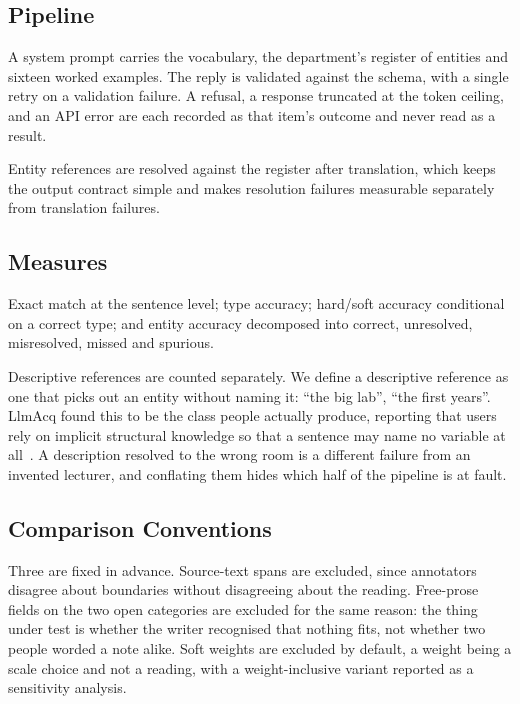 \documentclass[sigconf,screen,review,anonymous]{acmart}
\begin{document}
\subsection{Pipeline}

A system prompt carries the vocabulary, the department's register of entities
and sixteen worked examples. The reply is validated against the schema, with a
single retry on a validation failure. A refusal, a response truncated at the
token ceiling, and an API error are each recorded as that item's outcome and
never read as a result.

Entity references are resolved against the register after translation, which
keeps the output contract simple and makes resolution failures measurable
separately from translation failures.

\subsection{Measures}

Exact match at the sentence level; type accuracy; hard/soft accuracy
conditional on a correct type; and entity accuracy decomposed into correct,
unresolved, misresolved, missed and spurious.

Descriptive references are counted separately. We define a descriptive
reference as one that picks out an entity without naming it: ``the big lab'',
``the first years''. LlmAcq found this to be the class people actually
produce, reporting that users rely on implicit structural knowledge so that a
sentence may name no variable at all~\cite{mechqrane2026llmacq}. A description
resolved to the wrong room is a different failure from an invented lecturer,
and conflating them hides which half of the pipeline is at fault.

\subsection{Comparison Conventions}

Three are fixed in advance. Source-text spans are excluded, since annotators
disagree about boundaries without disagreeing about the reading. Free-prose
fields on the two open categories are excluded for the same reason: the thing
under test is whether the writer recognised that nothing fits, not whether two
people worded a note alike. Soft weights are excluded by default, a weight
being a scale choice and not a reading, with a weight-inclusive variant
reported as a sensitivity analysis.
\end{document}

